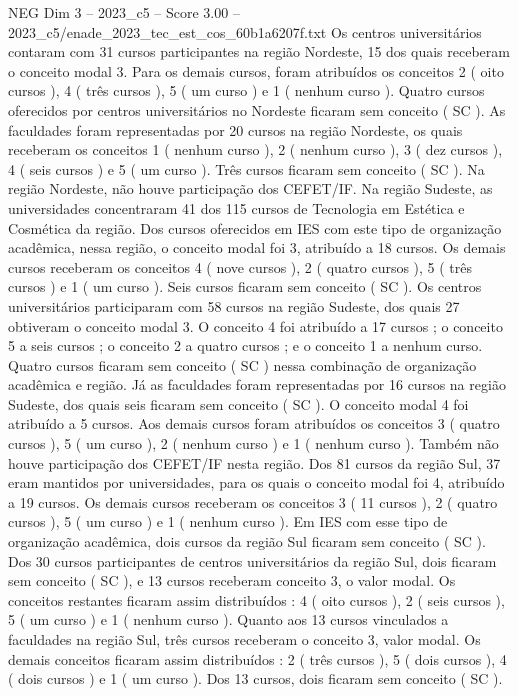 \begin{textsample}{NEG Dim 3 – 2023\_c5 – Score 3.00 – 2023\_c5/enade\_2023\_tec\_est\_cos\_60b1a6207f.txt}
Os centros universitários contaram com 31 cursos participantes na região Nordeste, 15 dos quais receberam o conceito modal 3.
Para os demais cursos, foram atribuídos os conceitos 2 ( oito cursos ), 4 ( três cursos ), 5 ( um curso ) e 1 ( nenhum curso ).
Quatro cursos oferecidos por centros universitários no Nordeste ficaram sem conceito ( SC ).
As faculdades foram representadas por 20 cursos na região Nordeste, os quais receberam os conceitos 1 ( nenhum curso ), 2 ( nenhum curso ), 3 ( dez cursos ), 4 ( seis cursos ) e 5 ( um curso ).
Três cursos ficaram sem conceito ( SC ).
Na região Nordeste, não houve participação dos CEFET/IF.
Na região Sudeste, as universidades concentraram 41 dos 115 cursos de Tecnologia em Estética e Cosmética da região.
Dos cursos oferecidos em IES com este tipo de organização acadêmica, nessa região, o conceito modal foi 3, atribuído a 18 cursos.
Os demais cursos receberam os conceitos 4 ( nove cursos ), 2 ( quatro cursos ), 5 ( três cursos ) e 1 ( um curso ).
Seis cursos ficaram sem conceito ( SC ).
Os centros universitários participaram com 58 cursos na região Sudeste, dos quais 27 obtiveram o conceito modal 3.
O conceito 4 foi atribuído a 17 cursos ; o conceito 5 a seis cursos ; o conceito 2 a quatro cursos ; e o conceito 1 a nenhum curso.
Quatro cursos ficaram sem conceito ( SC ) nessa combinação de organização acadêmica e região.
Já as faculdades foram representadas por 16 cursos na região Sudeste, dos quais seis ficaram sem conceito ( SC ).
O conceito modal 4 foi atribuído a 5 cursos.
Aos demais cursos foram atribuídos os conceitos 3 ( quatro cursos ), 5 ( um curso ), 2 ( nenhum curso ) e 1 ( nenhum curso ).
Também não houve participação dos CEFET/IF nesta região.
Dos 81 cursos da região Sul, 37 eram mantidos por universidades, para os quais o conceito modal foi 4, atribuído a 19 cursos.
Os demais cursos receberam os conceitos 3 ( 11 cursos ), 2 ( quatro cursos ), 5 ( um curso ) e 1 ( nenhum curso ).
Em IES com esse tipo de organização acadêmica, dois cursos da região Sul ficaram sem conceito ( SC ).
Dos 30 cursos participantes de centros universitários da região Sul, dois ficaram sem conceito ( SC ), e 13 cursos receberam conceito 3, o valor modal.
Os conceitos restantes ficaram assim distribuídos : 4 ( oito cursos ), 2 ( seis cursos ), 5 ( um curso ) e 1 ( nenhum curso ).
Quanto aos 13 cursos vinculados a faculdades na região Sul, três cursos receberam o conceito 3, valor modal.
Os demais conceitos ficaram assim distribuídos : 2 ( três cursos ), 5 ( dois cursos ), 4 ( dois cursos ) e 1 ( um curso ).
Dos 13 cursos, dois ficaram sem conceito ( SC ).

\end{textsample}
